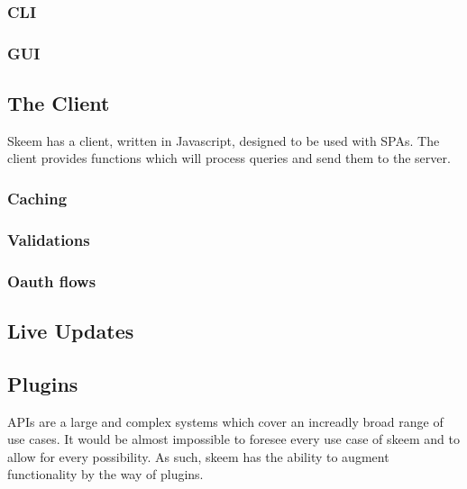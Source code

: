 \documentclass[
  12pt,
]{article}
\begin{document}
\hypertarget{cli}{%
\subsubsection{CLI}\label{cli}}

\hypertarget{gui}{%
\subsubsection{GUI}\label{gui}}

\hypertarget{the-client}{%
\subsection{The Client}\label{the-client}}

Skeem has a client, written in Javascript, designed to be used with
SPAs. The client provides functions which will process queries and send
them to the server.

\hypertarget{caching}{%
\subsubsection{Caching}\label{caching}}

\hypertarget{validations}{%
\subsubsection{Validations}\label{validations}}

\hypertarget{oauth-flows}{%
\subsubsection{Oauth flows}\label{oauth-flows}}

\hypertarget{live-updates}{%
\subsection{Live Updates}\label{live-updates}}

\hypertarget{plugins}{%
\subsection{Plugins}\label{plugins}}

APIs are a large and complex systems which cover an increadly broad
range of use cases. It would be almost impossible to foresee every use
case of skeem and to allow for every possibility. As such, skeem has the
ability to augment functionality by the way of plugins.
\end{document}

